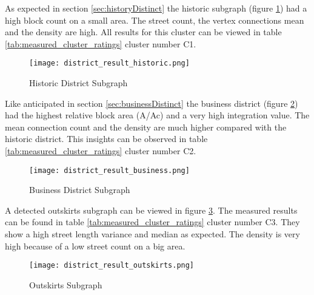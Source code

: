 As expected in section \ref{sec:historyDistinct} the historic subgraph (figure \ref{fig:result_historic_district}) had a high block count on a small area. The street count, the vertex connections mean and the density are high. All results for this cluster can be viewed in table \ref{tab:measured_cluster_ratings} cluster number C1.

\begin{figure}[ht]
    \centering
    \begin{mdframed}[style=mdthight, userdefinedwidth=0.4\textwidth, align=center]
        \texttt{[image: district\_result\_historic.png]}
    \end{mdframed}
    \caption{Historic District Subgraph}
    \label{fig:result_historic_district}
\end{figure}
\FloatBarrier

Like anticipated in section \ref{sec:businessDistinct} the business district (figure \ref{fig:result_business_district}) had the highest relative block area (A/Ac) and a very high integration value. The mean connection count and the density are much higher compared with the historic district. This insights can be observed in table \ref{tab:measured_cluster_ratings} cluster number C2.

\begin{figure}[ht]
    \centering
    \begin{mdframed}[style=mdthight, userdefinedwidth=0.4\textwidth, align=center]
        \texttt{[image: district\_result\_business.png]}
    \end{mdframed}
    \caption{Business District Subgraph}
    \label{fig:result_business_district}
\end{figure}
\FloatBarrier

A detected outskirts subgraph can be viewed in figure \ref{fig:result_outskirts_district}. The measured results can be found in table \ref{tab:measured_cluster_ratings} cluster number C3. They show a high street length variance and median as expected. The density is very high because of a low street count on a big area.

\begin{figure}[ht]
    \centering
    \begin{mdframed}[style=mdthight, userdefinedwidth=0.6\textwidth, align=center]
        \texttt{[image: district\_result\_outskirts.png]}
    \end{mdframed}
    \caption{Outskirts Subgraph}
    \label{fig:result_outskirts_district}
\end{figure}
\FloatBarrier

